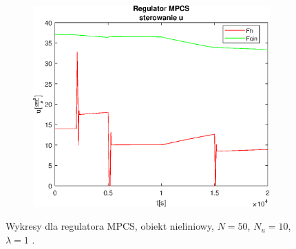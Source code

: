 \begin{figure}[h!]
   \begin{subfigure}[b]{0.4\textwidth}
      \includegraphics[width=1\linewidth]{img/MPCSanaRK/MPCSRKControlN50Nu10l100.eps}
      \caption{}
      \label{fig:fig:MPCSRKN50Nu10l1003}
   \end{subfigure}
       
   \caption{Wykresy dla regulatora MPCS, obiekt nieliniowy, $N = 50$, $N_u = 10$, $\lambda = 1$ .}
   \label{fig:MPCSRKN50Nu10l100}
\end{figure}
           
